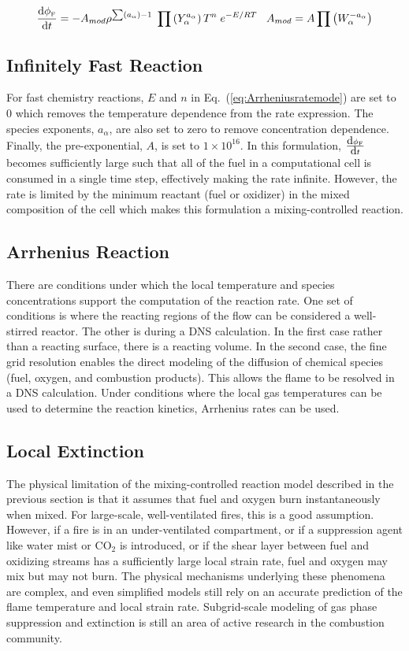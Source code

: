 \begin{equation}\label{eq:Arrheniusratemode}
\frac{\mbox{d}\phi_{\tiny \hbox{F}}}{\mbox{d}t} = -A_{mod} \rho^{\sum (a_{\alpha}) -1} \; \prod \left(Y_{\alpha}^{a_{\alpha}} \right) T^n \; e^{-E/RT} \;\;\; A_{mod} = A \prod \left(W_{\alpha}^{-a_{\alpha}} \right)  
\end{equation}

\subsection{Infinitely Fast Reaction}
For fast chemistry reactions, $E$ and $n$ in Eq.~(\ref{eq:Arrheniusratemode}) are set to $0$ which removes the temperature dependence from the rate expression. The species exponents, $a_{\alpha}$, are also set to zero to remove concentration dependence. Finally, the pre-exponential, $A$, is set to $1 \times 10^{16}$. In this formulation, $\frac{\mbox{d}\phi_{\tiny \hbox{F}}}{\mbox{d}t}$ becomes sufficiently large such that all of the fuel in a computational cell is consumed in a single time step, effectively making the rate infinite. However, the rate is limited by the minimum reactant (fuel or oxidizer) in the mixed composition of the cell which makes this formulation a mixing-controlled reaction.   

\subsection{Arrhenius Reaction}
There are conditions under which the local temperature and species concentrations support the computation of the reaction rate.  One set of conditions is where the reacting regions of the flow can be considered a well-stirred reactor.  The other is during a DNS calculation.  In the first case rather than a reacting surface, there is a reacting volume.  In the second case, the fine grid resolution enables the direct modeling of the diffusion of chemical species (fuel,
oxygen, and combustion products).  This allows the flame to be resolved in a DNS calculation.  Under conditions where the local gas
temperatures can be used to determine the reaction kinetics, Arrhenius rates can be used.


\subsection{Local Extinction}

\label{extinction}

The physical limitation of the mixing-controlled reaction model described in the previous section is that it assumes that fuel and oxygen burn instantaneously when mixed. For large-scale, well-ventilated
fires, this is a good assumption. However, if a fire is in an
under-ventilated compartment, or if a suppression agent like water
mist or CO$_2$ is introduced, or if the shear layer between fuel and oxidizing streams
has a sufficiently large local strain rate,
fuel and oxygen may mix but may not burn.
The physical mechanisms underlying these phenomena are complex, and
even simplified models still rely on an accurate prediction
of the flame temperature and local strain rate.
Subgrid-scale modeling of gas phase suppression and
extinction is still an area of active research in the combustion
community.

